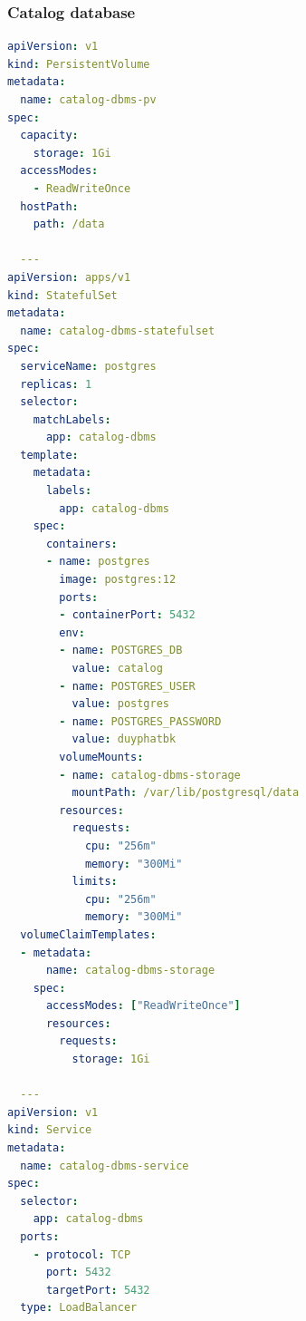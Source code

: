 \subsubsection*{Catalog database}
\begin{lstlisting}[language=yaml]
apiVersion: v1
kind: PersistentVolume
metadata:
  name: catalog-dbms-pv
spec:
  capacity:
    storage: 1Gi
  accessModes:
    - ReadWriteOnce
  hostPath:
    path: /data

  ---
apiVersion: apps/v1
kind: StatefulSet
metadata:
  name: catalog-dbms-statefulset
spec:
  serviceName: postgres
  replicas: 1
  selector:
    matchLabels:
      app: catalog-dbms
  template:
    metadata:
      labels:
        app: catalog-dbms
    spec:
      containers:
      - name: postgres
        image: postgres:12
        ports:
        - containerPort: 5432
        env:
        - name: POSTGRES_DB
          value: catalog
        - name: POSTGRES_USER
          value: postgres
        - name: POSTGRES_PASSWORD
          value: duyphatbk
        volumeMounts:
        - name: catalog-dbms-storage
          mountPath: /var/lib/postgresql/data
        resources:
          requests:
            cpu: "256m"
            memory: "300Mi"
          limits:
            cpu: "256m"
            memory: "300Mi"
  volumeClaimTemplates:
  - metadata:
      name: catalog-dbms-storage
    spec:
      accessModes: ["ReadWriteOnce"]
      resources:
        requests:
          storage: 1Gi

  ---
apiVersion: v1
kind: Service
metadata:
  name: catalog-dbms-service
spec:
  selector:
    app: catalog-dbms
  ports:
    - protocol: TCP
      port: 5432
      targetPort: 5432
  type: LoadBalancer
\end{lstlisting}

